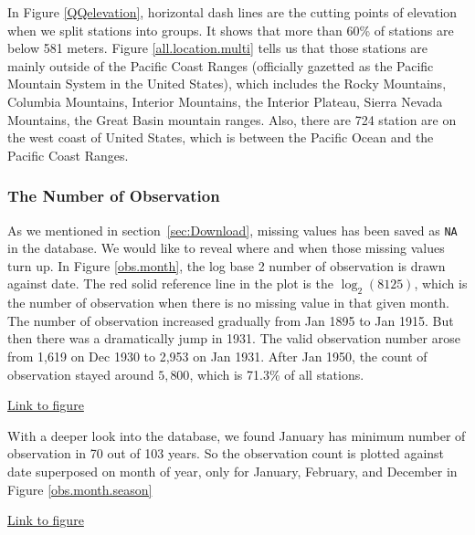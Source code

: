 In Figure \href{../plots/QQelevation.pdf}{\ref*{QQelevation}}, horizontal dash 
lines are the cutting points of elevation when we split stations into groups. 
It shows that more than
60\% of stations are below 581 meters. Figure 
\href{../plots/allstations.pdf}{\ref*{all.location.multi}} tells us that those 
stations are mainly outside of the 
Pacific Coast Ranges (officially gazetted as the Pacific Mountain System in the 
United States), which includes the Rocky Mountains, Columbia Mountains, Interior
Mountains, the Interior Plateau, Sierra Nevada Mountains, the Great Basin mountain 
ranges. Also, there are 724 station are on the west coast of United States, which
is between the Pacific Ocean and the Pacific Coast Ranges.

\subsubsection{The Number of Observation}

As we mentioned in section~\ref{sec:Download}, missing values has been saved as 
\texttt{NA} in the database. We would like to reveal where and when those 
missing values turn up.
In Figure \href{../plots/obs_month.pdf}{\ref*{obs.month}}, the log base 2 number
of observation is drawn against date. The red solid reference line in the plot is 
the $\log_2(8125)$, which is the number of observation when there is no missing 
value in that given month. The number of observation increased gradually from Jan
1895 to Jan 1915. But then there was a dramatically jump in 1931. The valid
observation number arose from 1,619 on Dec 1930 to 2,953 on Jan 1931. After Jan 
1950, the count of observation stayed around $5,800$, which is 71.3\% of all
stations. 

\begin{framed}
\begin{center}
  \href{../plots/obs_month.pdf}{Link to figure}
  \label{obs.month}
\end{center}
\end{framed}

With a deeper look into the database, we found January has minimum number of 
observation in 70 out of 103 years. So the observation count is plotted against
date superposed on month of year, only for January, February, and December in 
Figure \href{../plots/obs_month_byseason.pdf}{\ref*{obs.month.season}}

\begin{framed}
\begin{center}
  \href{../plots/obs_month_byseason.pdf}{Link to figure}
  \label{obs.month.season}
\end{center}
\end{framed}

